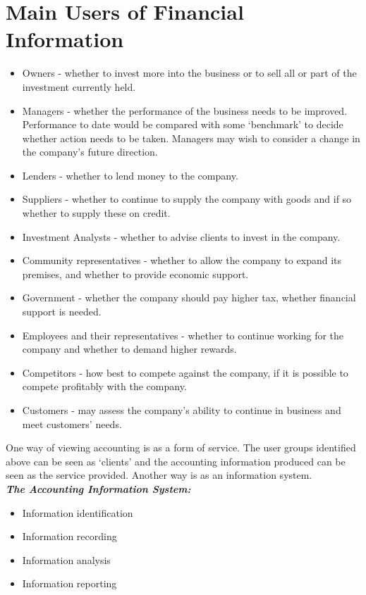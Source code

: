 \documentclass{report}
\begin{document}
\section{Main Users of Financial Information}

\begin{itemize}
    \item Owners - whether to invest more into the business or to sell all or part of the investment currently held.
    \item Managers - whether the performance of the business needs to be improved. Performance to date would be compared with some ‘benchmark’ to decide whether action needs to be taken. Managers may wish to consider a change in the company’s future direction.
    \item Lenders - whether to lend money to the company.
    \item Suppliers - whether to continue to supply the company with goods and if so whether to supply these on credit.
    \item Investment Analysts - whether to advise clients to invest in the company.
    \item Community representatives - whether to allow the company to expand its premises, and whether to provide economic support.
    \item Government - whether the company should pay higher tax, whether financial support is needed.
    \item Employees and their representatives - whether to continue working for the company and whether to demand higher rewards.
    \item Competitors - how best to compete against the company, if it is possible to compete profitably with the company.
    \item Customers - may assess the company’s ability to continue in business and meet customers’ needs.\\
\end{itemize}

One way of viewing accounting is as a form of service. The user groups identified above can be seen as ‘clients’ and the accounting information produced can be seen as the service provided. Another way is as an information system.\\

\textit{\textbf{The Accounting Information System:}}
\begin{itemize}
    \item Information identification
    \item Information recording
    \item Information analysis
    \item Information reporting
\end{itemize}
\end{document}
